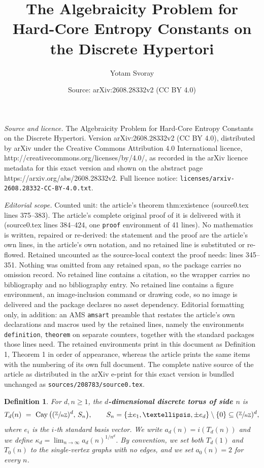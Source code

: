 \documentclass[10pt,a4paper]{amsart}
\title{The Algebraicity Problem for Hard-Core Entropy Constants on the Discrete Hypertori}
\author{Yotam Svoray}
\date{Source: arXiv:2608.28332v2 (CC BY 4.0)}
\newtheorem{definition}{Definition}
\DeclareMathOperator{\Cay}{Cay}
\newcommand{\Z}{\mathbb{Z}}
\newcommand{\quot}[2]{\sfrac{#1}{#2}}
\begin{document}
\maketitle

\noindent\emph{Source and licence.} The Algebraicity Problem for Hard-Core Entropy Constants on the Discrete Hypertori. Version arXiv:2608.28332v2 (CC BY 4.0), distributed by arXiv under the Creative Commons Attribution 4.0 International licence, http://creativecommons.org/licenses/by/4.0/, as recorded in the arXiv licence metadata for this exact version and shown on the abstract page https://arxiv.org/abs/2608.28332v2. Full licence notice: \texttt{licenses/arxiv-2608.28332-CC-BY-4.0.txt}.\par\smallskip

\noindent\textit{Editorial scope.} Counted unit: the article's theorem thm:existence (source0.tex lines 375--383). The article's complete original proof of it is delivered with it (source0.tex lines 384--424, one \texttt{proof} environment of 41 lines). No mathematics is written, repaired or re-derived: the statement and the proof are the article's own lines, in the article's own notation, and no retained line is substituted or re-flowed.  Retained uncounted as the source-local context the proof needs: lines 345--351.  Nothing was omitted from any retained span, so the package carries no omission record.  No retained line contains a citation, so the wrapper carries no bibliography and no bibliography entry.  No retained line contains a figure environment, an image-inclusion command or drawing code, so no image is delivered and the package declares no asset dependency.  Editorial formatting only, in addition: an AMS \texttt{amsart} preamble that restates the article's own declarations and macros used by the retained lines, namely the environments \texttt{definition}, \texttt{theorem} on separate counters, together with the standard packages those lines need.  The retained environments print in this document as Definition 1, Theorem 1 in order of appearance, whereas the article prints the same items with the numbering of its own full document.  The complete native source of the article as distributed in the arXiv e-print for this exact version is bundled unchanged as \texttt{sources/208783/source0.tex}.
\begin{definition}\label{def:torus}
For $d,n\ge1$, the \textbf{$d$-dimensional discrete torus of side $n$} is
\[
T_d(n)\ =\ \Cay\big((\quot{\Z}{n\Z})^d,\,S_n\big),\qquad S_n=\{\pm e_1,\dots,\pm e_d\}\setminus\{0\}\subseteq(\quot{\Z}{n\Z})^d,
\]
where $e_i$ is the $i$-th standard basis vector. We write $a_d(n)=i(T_d(n))$ and we define $\kappa_d=\lim_{n\to\infty}a_d(n)^{1/n^d}$. By convention, we set both $T_d(1)$ and $T_0(n)$ to the single-vertex graphs with no edges, and we set $a_0(n)=2$ for every $n$.
\end{definition}
\end{document}
